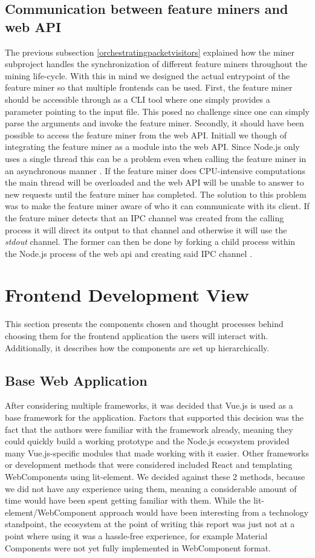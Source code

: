 \subsection{Communication between feature miners and web API}
The previous subsection \ref{orchestratingpacketvisitors} explained how the miner subproject handles the synchronization of different feature miners throughout the mining life-cycle. With this in mind we designed the actual entrypoint of the feature miner so that multiple frontends can be used. First, the feature miner should be accessible through as a CLI tool where one simply provides a parameter pointing to the input file. This posed no challenge since one can simply parse the arguments and invoke the feature miner.
Secondly, it should have been possible to access the feature miner from the web API. Initiall we though of integrating the feature miner as a module into the web API. Since Node.js only uses a single thread this can be a problem even when calling the feature miner in an asynchronous manner \cite{nodejs_about}. If the feature miner does CPU-intensive computations the main thread will be overloaded and the web API will be unable to answer to new requests until the feature miner has completed.
The solution to this problem was to make the feature miner aware of who it can communicate with its client. If the feature miner detects that an IPC channel was created from the calling process it will direct its output to that channel and otherwise it will use the \textit{stdout} channel. The former can then be done by forking a child process within the Node.js process of the web api and creating said IPC channel \cite{nodejs_childprocesses}.


 \section{Frontend Development View}
 This section presents the components chosen and thought processes behind choosing them for the frontend application the users will interact with. Additionally, it describes how the components are set up hierarchically.
 \subsection{Base Web Application}
 After considering multiple frameworks, it was decided that Vue.js is used as a base framework for the application. Factors that supported this decision was the fact that the authors were familiar with the framework already, meaning they could quickly build a working prototype and the Node.js ecosystem provided many Vue.js-specific modules that made working with it easier. Other frameworks or development methods that were considered included React and templating WebComponents using lit-element. We decided against these 2 methods, because we did not have any experience using them, meaning a considerable amount of time would have been spent getting familiar with them. While the lit-element/WebComponent approach would have been interesting from a technology standpoint, the ecosystem at the point of writing this report was just not at a point where using it was a hassle-free experience, for example Material Components were not yet fully implemented in WebComponent format.
 
